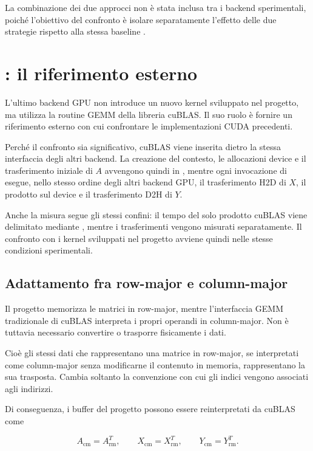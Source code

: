 La combinazione dei due approcci non è stata inclusa tra i backend
sperimentali, poiché l'obiettivo del confronto è isolare separatamente
l'effetto delle due strategie rispetto alla stessa baseline
.

\section{: il riferimento esterno}
\label{sec:cublas}

L'ultimo backend GPU non introduce un nuovo kernel sviluppato nel progetto,
ma utilizza la routine GEMM della libreria cuBLAS. Il suo ruolo è fornire un
riferimento esterno con cui confrontare le implementazioni CUDA precedenti.

Perché il confronto sia significativo, cuBLAS viene inserita dietro la stessa
interfaccia degli altri backend. La creazione del contesto, le allocazioni
device e il trasferimento iniziale di $A$ avvengono quindi in
, mentre ogni invocazione di 
esegue, nello stesso ordine degli altri backend GPU, il trasferimento H2D di
$X$, il prodotto sul device e il trasferimento D2H di $Y$.

Anche la misura segue gli stessi confini: il tempo del solo prodotto cuBLAS
viene delimitato mediante , mentre i trasferimenti vengono
misurati separatamente. Il confronto con i kernel sviluppati nel progetto
avviene quindi nelle stesse condizioni sperimentali.

\subsection{Adattamento fra row-major e column-major}

Il progetto memorizza le matrici in row-major, mentre l'interfaccia GEMM
tradizionale di cuBLAS interpreta i propri operandi in column-major.
Non è tuttavia necessario convertire o trasporre fisicamente i dati.

Cioè gli stessi dati che rappresentano una matrice in row-major, se interpretati
come column-major senza modificarne il contenuto in memoria, rappresentano
la sua trasposta.
Cambia soltanto la convenzione con cui gli indici vengono associati agli indirizzi.

Di conseguenza, i buffer del progetto possono essere reinterpretati da
cuBLAS come

\[
A_{\mathrm{cm}} = A_{\mathrm{rm}}^T,
\qquad
X_{\mathrm{cm}} = X_{\mathrm{rm}}^T,
\qquad
Y_{\mathrm{cm}} = Y_{\mathrm{rm}}^T.
\]


